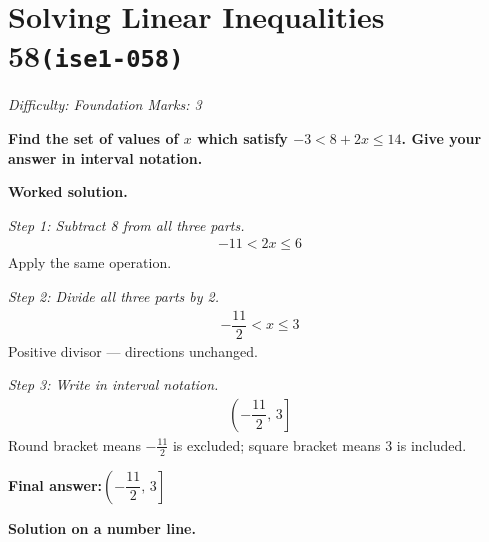\documentclass[11pt]{article}
\newcommand{\question}[1]{\par\medskip\noindent\textbf{#1}\par}
\begin{document}
\section*{Solving Linear Inequalities 58\quad\small\texttt{(ise1-058)}}
\textit{Difficulty: Foundation \quad\textbar\quad Marks: 3}

\question{Find the set of values of \( x \) which satisfy \( -3 < 8 + 2x \leq 14 \). Give your answer in interval notation.}

\textbf{Worked solution.}

\textit{Step 1: Subtract 8 from all three parts.}
\[\begin{gathered}
-11 < 2x \leq 6
\end{gathered}\]
Apply the same operation.

\textit{Step 2: Divide all three parts by 2.}
\[\begin{gathered}
-\dfrac{11}{2} < x \leq 3
\end{gathered}\]
Positive divisor --- directions unchanged.

\textit{Step 3: Write in interval notation.}
\[\begin{gathered}
\left(-\dfrac{11}{2},\, 3\right]
\end{gathered}\]
Round bracket means \( -\tfrac{11}{2} \) is excluded; square bracket means 3 is included.

\begin{answerbox}
\textbf{Final answer:}\quad \(\displaystyle  \left(-\dfrac{11}{2},\, 3\right] \)
\end{answerbox}
\textbf{Solution on a number line.}
\end{document}
